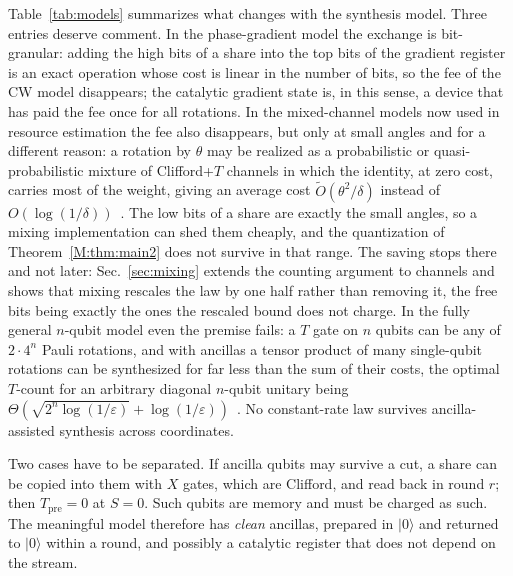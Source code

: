 \documentclass[aps,prx,twocolumn,superscriptaddress,nofootinbib,longbibliography]{revtex4-2}
\theoremstyle{plain}
\theoremstyle{definition}
\theoremstyle{remark}
\newcommand{\Tpre}{T_{\mathrm{pre}}}
\begin{document}
Table~\ref{tab:models} summarizes what changes with the synthesis model. Three entries deserve comment. In the phase-gradient model the exchange is bit-granular: adding the high bits of a share into the top bits of the gradient register is an exact operation whose cost is linear in the number of bits, so the fee of the CW model disappears; the catalytic gradient state is, in this sense, a device that has paid the fee once for all rotations. In the mixed-channel models now used in resource estimation the fee also disappears, but only at small angles and for a different reason: a rotation by $\theta$ may be realized as a probabilistic or quasi-probabilistic mixture of Clifford+$T$ channels in which the identity, at zero cost, carries most of the weight, giving an average cost $\tilde O(\theta^2/\delta)$ instead of $O(\log(1/\delta))$~\cite{Bothe}. The low bits of a share are exactly the small angles, so a mixing implementation can shed them cheaply, and the quantization of Theorem~\ref{M:thm:main2} does not survive in that range. The saving stops there and not later: Sec.~\ref{sec:mixing} extends the counting argument to channels and shows that mixing rescales the law by one half rather than removing it, the free bits being exactly the ones the rescaled bound does not charge. In the fully general $n$-qubit model even the premise fails: a $T$ gate on $n$ qubits can be any of $2\cdot4^n$ Pauli rotations, and with ancillas a tensor product of many single-qubit rotations can be synthesized for far less than the sum of their costs, the optimal $T$-count for an arbitrary diagonal $n$-qubit unitary being $\Theta(\sqrt{2^n\log(1/\varepsilon)}+\log(1/\varepsilon))$~\cite{GKW}. No constant-rate law survives ancilla-assisted synthesis across coordinates.

Two cases have to be separated. If ancilla qubits may survive a cut, a share can be copied into them with $X$ gates, which are Clifford, and read back in round $r$; then $\Tpre=0$ at $S=0$. Such qubits are memory and must be charged as such. The meaningful model therefore has \emph{clean} ancillas, prepared in $|0\rangle$ and returned to $|0\rangle$ within a round, and possibly a catalytic register that does not depend on the stream.
\end{document}
